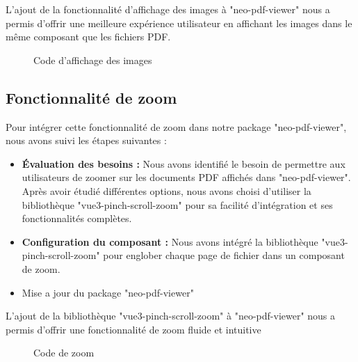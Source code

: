 L'ajout de la fonctionnalité d'affichage des images à "neo-pdf-viewer" nous a permis d'offrir une meilleure expérience utilisateur en affichant les images dans le même composant que les fichiers PDF.

\begin{figure}[H]
    \centering
    \caption{Code d'affichage des images}
    \label{appendix:codedisplayimage}
\end{figure}

\subsection{Fonctionnalité de zoom}

Pour intégrer cette fonctionnalité de zoom dans notre package "neo-pdf-viewer", nous avons suivi les étapes suivantes :
\begin{itemize}
    \item \textbf{Évaluation des besoins :} Nous avons identifié le besoin de permettre aux utilisateurs de zoomer sur les documents PDF affichés dans "neo-pdf-viewer". Après avoir étudié différentes options, nous avons choisi d'utiliser la bibliothèque "vue3-pinch-scroll-zoom" pour sa facilité d'intégration et ses fonctionnalités complètes.
    \item \textbf{Configuration du composant :} Nous avons intégré la bibliothèque "vue3-pinch-scroll-zoom" pour englober chaque page de fichier dans un composant de zoom. 
    \item Mise a jour du package "neo-pdf-viewer" 
\end{itemize}

L'ajout de la bibliothèque "vue3-pinch-scroll-zoom" à "neo-pdf-viewer" nous a permis d'offrir une fonctionnalité de zoom fluide et intuitive

\begin{figure}[H]
    \centering
    \caption{Code de zoom}
    \label{appendix:zoom_code}
\end{figure}

\label{appendix:neo-pdf-viewer}
